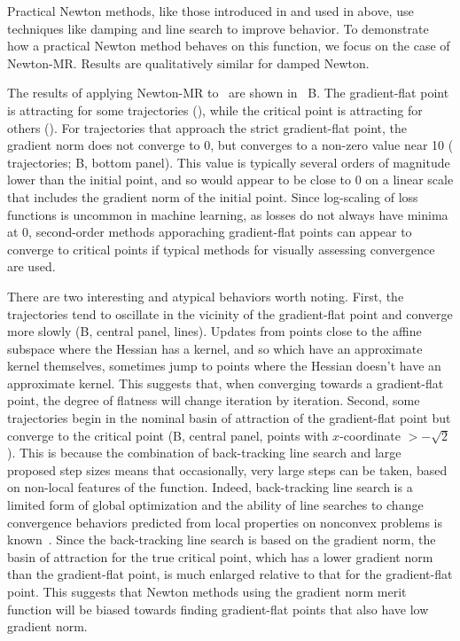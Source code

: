 \documentclass[../../thesis.tex]{subfiles}
\begin{document}
Practical Newton methods,
like those introduced in 
and used in  above,
use techniques like
damping and line search to improve behavior.
To demonstrate how a practical Newton method
behaves on this function,
we focus on the case of Newton-MR\@.
Results are qualitatively similar for damped Newton.

The results of applying Newton-MR
to~ are shown in%
~B.
The gradient-flat point is attracting
for some trajectories
(\failcolor{}),
while the critical point is attracting for others
(\successcolor{}).
For trajectories that approach the strict gradient-flat point,
the gradient norm does not converge to 0,
but converges to a non-zero value near 10
(\failcolor{} trajectories; B, bottom panel).
This value is typically several orders of magnitude lower
than the initial point, and so would appear to be close to 0
on a linear scale that includes the gradient norm of the initial point.
Since log-scaling of loss functions is uncommon in machine learning,
as losses do not always have minima at 0,
second-order methods apporaching gradient-flat points
can appear to converge to critical points
if typical methods for visually assessing convergence are used.

There are two interesting and atypical behaviors worth noting.
First, the trajectories tend to oscillate
in the vicinity of the gradient-flat point
and converge more slowly
(B, central panel, \failcolor{} lines).
Updates from points close to the affine subspace where the Hessian has a kernel,
and so which have an approximate kernel themselves,
sometimes jump to points where the Hessian doesn't have an approximate kernel.
This suggests that, when converging towards a gradient-flat point,
the degree of flatness will change iteration by iteration.
Second, some trajectories begin in the nominal basin
of attraction of the gradient-flat point
but converge to the critical point
(B, central panel, \successcolor{} points
with $x$-coordinate $>-\sqrt{2}$).
This is because the combination of back-tracking line search
and large proposed step sizes means that occasionally,
very large steps can be taken, based on non-local features of the function.
Indeed,
back-tracking line search is a limited form of global optimization
and the ability of line searches
to change convergence behaviors predicted from local properties
on nonconvex problems
is known~\cite{nocedal2006}.
Since the back-tracking line search is based on the gradient norm,
the basin of attraction for the true critical point,
which has a lower gradient norm than the gradient-flat point,
is much enlarged relative to that for the gradient-flat point.
This suggests that Newton methods
using the gradient norm merit function will be biased
towards finding gradient-flat points
that also have low gradient norm.
\end{document}

